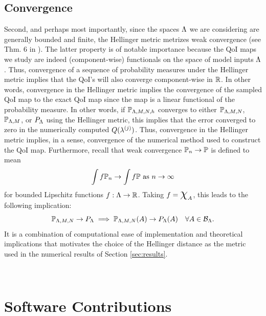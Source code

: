 \subsection{Convergence}
Second, and perhaps most importantly, since the spaces ${\Lambda}$ we are considering are generally bounded and finite, the Hellinger metric metrizes weak convergence (see Thm. 6 in \cite{GS02}).
The latter property is of notable importance because the QoI maps we study are indeed (component-wise) functionals on the space of model inputs ${\Lambda}$.
Thus, convergence of a sequence of probability measures under the Hellinger metric implies that the QoI's will also converge component-wise in $\mathbb{R}$.
In other words, convergence in the Hellinger metric implies the convergence of the sampled QoI map to the exact QoI map since the map is a linear functional of the probability measure.
In other words, if $\mathbb{P}_{{\Lambda},M,N,h}$ converges to either $\mathbb{P}_{{\Lambda},M,N}$, $\mathbb{P}_{{\Lambda},M}$, or $P_{\Lambda}$ using the Hellinger metric, this implies that the error converged to zero in the numerically computed $Q(\lambda^{(j)})$.
Thus, convergence in the Hellinger metric implies, in a sense, convergence of the numerical method used to construct the QoI map.
Furthermore, recall that weak convergence $\mathbb{P}_n \to \mathbb{P}$ is defined to mean
\[
\int f \mathbb{P}_n \to \int f \mathbb{P} \text{ as } n \to \infty
\]
for bounded Lipschitz functions $f:{\Lambda}\to\mathbb{R}$.
Taking $f = \Chi_A$, this leads to the following implication:
\[
\mathbb{P}_{{\Lambda}, M, N} \to P_{\Lambda} \implies \mathbb{P}_{{\Lambda}, M, N} (A) \to P_{\Lambda} (A) \quad \forall{A\in\mathcal{B}_{{\Lambda}}}.
\]
It is a combination of computational ease of implementation and theoretical implications that motivates the choice of the Hellinger distance as the metric used in the numerical results of Section \ref{sec:results}.






\
\section{Software Contributions}\label{sec:ch03-software}

